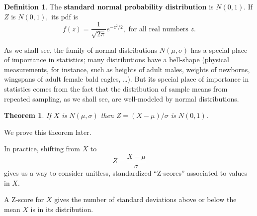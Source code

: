 \documentclass[
]{book}
\newtheorem{theorem}{Theorem}[chapter]
\theoremstyle{definition}
\newtheorem{definition}{Definition}[chapter]
\theoremstyle{definition}
\theoremstyle{definition}
\theoremstyle{definition}
\theoremstyle{remark}
\begin{document}
\begin{definition}
\protect\hypertarget{def:standard-normal}{}\label{def:standard-normal}The \textbf{standard normal probability distribution} is \(N(0,1)\). If \(Z\) is \(N(0,1),\) its pdf is \[f(z) = \frac{1}{\sqrt{2\pi}}e^{-z^2/2}, \text{ for all real numbers } z.\]
\end{definition}

As we shall see, the family of normal distributions \(N(\mu,\sigma)\) has a special place of importance in statistics; many distributions have a bell-shape (physical measurements, for instance, such as heights of adult males, weights of newborns, wingspans of adult female bald eagles, \ldots). But its special place of importance in statistics comes from the fact that the distribution of sample means from repeated sampling, as we shall see, are well-modeled by normal distributions.

\begin{theorem}
\protect\hypertarget{thm:standardizing-normal-distributions}{}\label{thm:standardizing-normal-distributions}If \(X\) is \(N(\mu,\sigma)\) then \(Z = (X-\mu)/\sigma\) is \(N(0,1)\).
\end{theorem}

We prove this theorem later.

In practice, shifting from \(X\) to \[Z = \frac{X-\mu}{\sigma}\] gives us a way to consider unitless, standardized ``Z-scores'' associated to values in \(X\).

A Z-score for \(X\) gives the number of standard deviations above or below the mean \(X\) is in its distribution.
\end{document}
